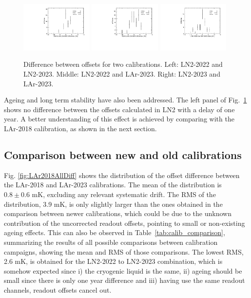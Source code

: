 \begin{figure}[htbp]
\centering
{\includegraphics[width=0.32\textwidth]{images/figure_19_a.pdf}}
{\includegraphics[width=0.32\textwidth]{images/figure_19_b.pdf}}
{\includegraphics[width=0.32\textwidth]{images/figure_19_c.pdf}}
\caption{Difference between offsets for two calibrations. Left: LN2-2022 and LN2-2023. Middle: LN2-2022 and LAr-2023. Right:  LN2-2023 and LAr-2023.}
\label{fig:comp_newCalib}
\end{figure}

Ageing and long term stability have also been addressed. The left panel of Fig.~\ref{fig:comp_newCalib} shows no difference between the offsets calculated in LN2 with a delay of one year. A better understanding of this effect is achieved by comparing with the LAr-2018 calibration, as shown in the next section.

\subsection{Comparison between new and old calibrations}
\label{sec:compNewOld}

Fig. \ref{fig:LAr2018AllDiff} shows the distribution of the offset difference between the LAr-2018 and LAr-2023 calibrations. The mean of the distribution is $0.8\pm0.6$ mK, excluding any relevant systematic drift. The RMS of the distribution, 3.9 mK, is only slightly larger than the ones obtained in the comparison between newer calibrations, which could be due to the unknown contribution of the uncorrected readout offsets, pointing to small or non-existing ageing effects. This can also be observed in Table~\ref{tab:calib_comparison}, summarizing the results of all possible comparisons between calibration campaigns, showing the mean and RMS of those comparisons. The lowest RMS, 2.6 mK, is obtained for the LN2-2022 to LN2-2023 combination, which is somehow expected since i) the cryogenic liquid is the same, ii) ageing should be small since there is only one year difference and iii) having use the same readout channels, readout offsets cancel out.


